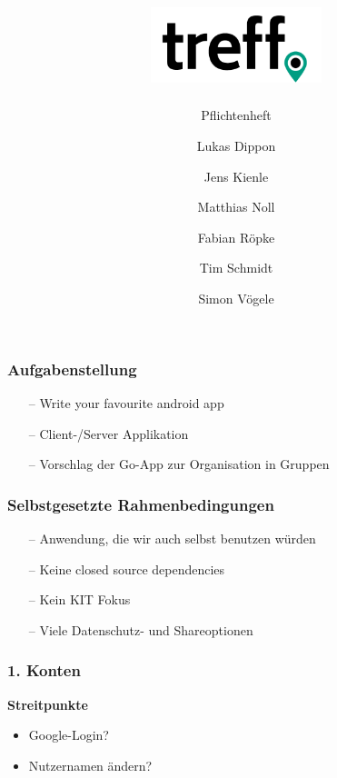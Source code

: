 \documentclass[aspectratio=1610]{beamer}
\title{\includegraphics[width = 50mm]{images/logo_crop.png}}
\subtitle{\huge Pflichtenheft}
\author{Lukas Dippon
	\and Jens Kienle
	\and Matthias Noll
	\and Fabian Röpke
	\and Tim Schmidt
	\and Simon Vögele}
\begin{document}
	\begin{frame}[plain]
	\maketitle
	\end{frame}

	\begin{frame}[plain]
		\frametitle{Aufgabenstellung}
		\begin{itemize}
			\setlength\itemsep{0.3em}
			\item[--] Write your favourite android app
			\item[--] Client-/Server Applikation
			\item[--] Vorschlag der Go-App zur Organisation in Gruppen
		\end{itemize}
	\end{frame}

	\begin{frame}[plain]
		\frametitle{Selbstgesetzte Rahmenbedingungen}
		\begin{itemize}
			\setlength\itemsep{0.3em}
			\item[--] Anwendung, die wir auch  selbst benutzen würden
			\item[--] Keine closed source dependencies
			\item[--] Kein KIT Fokus
			\item[--] Viele Datenschutz- und Shareoptionen
		\end{itemize}
	\end{frame}

	\begin{frame}[plain]
	\frametitle{1. Konten}
	\begin{minipage}{0.5\textwidth}
	\setlength{\fboxsep}{0pt}%
	\setlength{\fboxrule}{1pt}%
	\captionsetup{labelformat=empty}
	\centering
	\end{minipage}%
	\begin{minipage}{0.5\textwidth}
		\textbf<2->{Streitpunkte}
		\begin{itemize}
			\setlength\itemsep{0.3em}
			\item<2->[--] Google-Login?
			\item<3->[--] Nutzernamen ändern?
		\end{itemize}
	\end{minipage}
	\end{frame}
\end{document}
